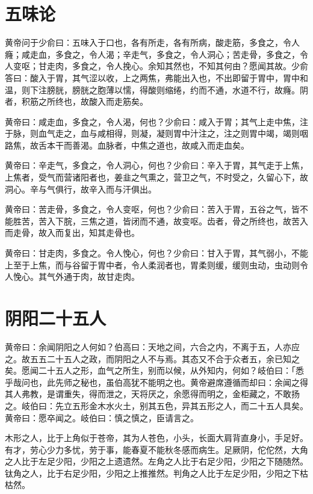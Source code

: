 \documentclass[a4paper,12pt,UTF8,twoside]{ctexbook}
\begin{document}
	\chapter{五味论}
	
	黄帝问于少俞曰：五味入于口也，各有所走，各有所病，酸走筋，多食之，令人癃；咸走血，多食之，令人渴；辛走气，多食之，令人洞心；苦走骨，多食之，令人变呕；甘走肉，多食之，令人挽心。余知其然也，不知其何由？愿闻其故。少俞答曰：酸入于胃，其气涩以收，上之两焦，弗能出入也，不出即留于胃中，胃中和温，则下注膀胱，膀胱之胞薄以懦，得酸则缩绻，约而不通，水道不行，故癃。阴者，积筋之所终也，故酸入而走筋矣。
	
	黄帝曰：咸走血，多食之，令人渴，何也？少俞曰：咸入于胃；其气上走中焦，注于脉，则血气走之，血与咸相得，则凝，凝则胃中汁注之，注之则胃中竭，竭则咽路焦，故舌本干而善渴。血脉者，中焦之道也，故咸入而走血矣。
	
	黄帝曰：辛走气，多食之，令人洞心，何也？少俞曰：辛入于胃，其气走于上焦，上焦者，受气而营诸阳者也，姜韭之气熏之，营卫之气，不时受之，久留心下，故洞心。辛与气俱行，故辛入而与汗俱出。
	
	黄帝曰：苦走骨，多食之，令人变呕，何也？少俞曰：苦入于胃，五谷之气，皆不能胜苦，苦入下脘，三焦之道，皆闭而不通，故变呕。齿者，骨之所终也，故苦入而走骨，故入而复出，知其走骨也。
	
	黄帝曰：甘走肉，多食之。令人悗心，何也？少俞曰：甘入于胃，其气弱小，不能上至于上焦，而与谷留于胃中者，令人柔润者也，胃柔则缓，缓则虫动，虫动则令人悗心。其气外通于肉，故甘走肉。
	
	\chapter{阴阳二十五人}
	
	黄帝曰：余闻阴阳之人何如？伯高曰：天地之间，六合之内，不离于五，人亦应之。故五五二十五人之政，而阴阳之人不与焉。其态又不合于众者五，余已知之矣。愿闻二十五人之形，血气之所生，别而以候，从外知内，何如？岐伯曰：「悉乎哉问也，此先师之秘也，虽伯高犹不能明之也。黄帝避席遵循而却曰：余闻之得其人弗教，是谓重失，得而泄之，天将厌之，余愿得而明之，金柜藏之，不敢扬之。岐伯曰：先立五形金木水火土，别其五色，异其五形之人，而二十五人具矣。黄帝曰：愿卒闻之。岐伯曰：慎之慎之，臣请言之。
	
	木形之人，比于上角似于苍帝，其为人苍色，小头，长面大肩背直身小，手足好。有才，劳心少力多忧，劳于事，能春夏不能秋冬感而病生。足厥阴，佗佗然，大角之人比于左足少阳，少阳之上遗遗然。左角之人比于右足少阳，少阳之下随随然。钛角之人，比于右足少阳，少阳之上推推然。判角之人比于左足少阳，少阳之下枯枯然。
	
\end{document}
